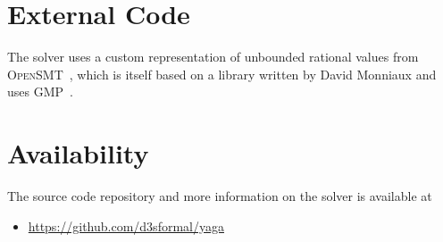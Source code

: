 \documentclass{easychair}
\begin{document}
    
    
    
    




\section{External Code}

The solver uses a custom representation of unbounded rational values from \textsc{OpenSMT}~\cite{hyvarinen_opensmt2_2016}, which
is itself based on a library written by David Monniaux and uses GMP~\cite{GMP}.


\section{Availability}
The source code repository and more information on the solver is
available at

\begin{itemize}
    \item \url{https://github.com/d3sformal/yaga}
\end{itemize}





\end{document}
